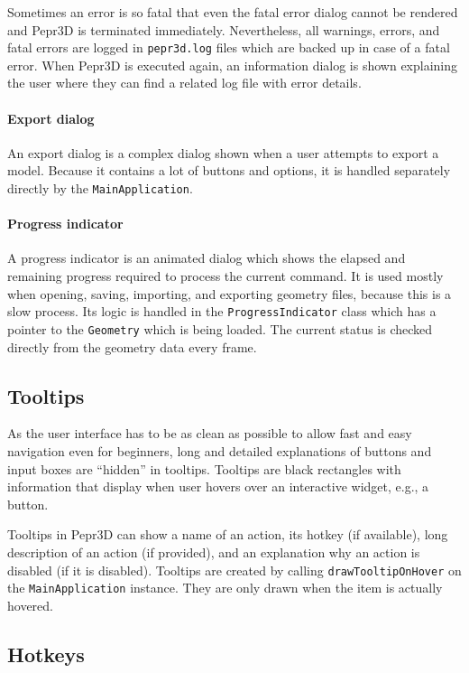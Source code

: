 Sometimes an error is so fatal that even the fatal error dialog cannot be rendered and Pepr3D is terminated immediately.
Nevertheless, all warnings, errors, and fatal errors are logged in \texttt{pepr3d.log} files which are backed up in case of a fatal error.
When Pepr3D is executed again, an information dialog is shown explaining the user where they can find a related log file with error details.

\paragraph{Export dialog}
An export dialog is a complex dialog shown when a user attempts to export a model.
Because it contains a lot of buttons and options, it is handled separately directly by the \texttt{MainApplication}.

\paragraph{Progress indicator}
A progress indicator is an animated dialog which shows the elapsed and remaining progress required to process the current command.
It is used mostly when opening, saving, importing, and exporting geometry files, because this is a slow process.
Its logic is handled in the \texttt{ProgressIndicator} class which has a pointer to the \texttt{Geometry} which is being loaded.
The current status is checked directly from the geometry data every frame.

\subsection{Tooltips}

As the user interface has to be as clean as possible to allow fast and easy navigation even for beginners, long and detailed explanations of buttons and input boxes are ``hidden'' in tooltips.
Tooltips are black rectangles with information that display when user hovers over an interactive widget, e.g., a button.

Tooltips in Pepr3D can show a name of an action, its hotkey (if available), long description of an action (if provided), and an explanation why an action is disabled (if it is disabled).
Tooltips are created by calling \texttt{drawTooltipOnHover} on the \texttt{MainApplication} instance.
They are only drawn when the item is actually hovered.

\subsection{Hotkeys}


